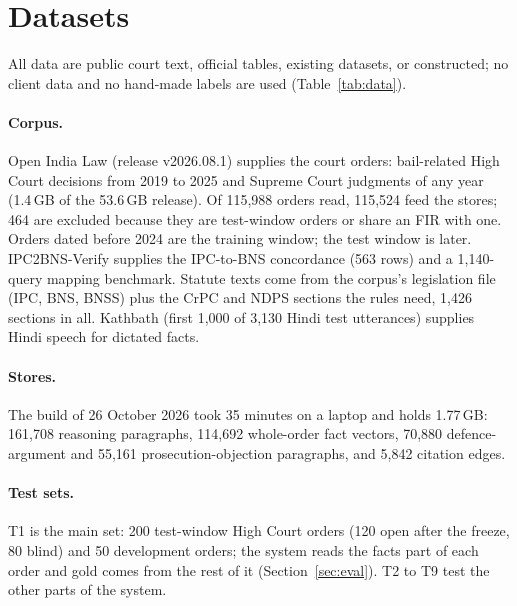 \section{Datasets}
\label{sec:data}

All data are public court text, official tables, existing datasets, or constructed; no client data and no hand-made labels are used (Table~\ref{tab:data}).

\paragraph{Corpus.} Open India Law (release v2026.08.1) supplies the court orders: bail-related High Court decisions from 2019 to 2025 and Supreme Court judgments of any year (1.4\,GB of the 53.6\,GB release). Of 115,988 orders read, 115,524 feed the stores; 464 are excluded because they are test-window orders or share an FIR with one. Orders dated before 2024 are the training window; the test window is later. IPC2BNS-Verify supplies the IPC-to-BNS concordance (563 rows) and a 1,140-query mapping benchmark. Statute texts come from the corpus's legislation file (IPC, BNS, BNSS) plus the CrPC and NDPS sections the rules need, 1,426 sections in all. Kathbath (first 1,000 of 3,130 Hindi test utterances) supplies Hindi speech for dictated facts.

\paragraph{Stores.} The build of 26 October 2026 took 35 minutes on a laptop and holds 1.77\,GB: 161,708 reasoning paragraphs, 114,692 whole-order fact vectors, 70,880 defence-argument and 55,161 prosecution-objection paragraphs, and 5,842 citation edges.

\paragraph{Test sets.} T1 is the main set: 200 test-window High Court orders (120 open after the freeze, 80 blind) and 50 development orders; the system reads the facts part of each order and gold comes from the rest of it (Section~\ref{sec:eval}). T2 to T9 test the other parts of the system.

